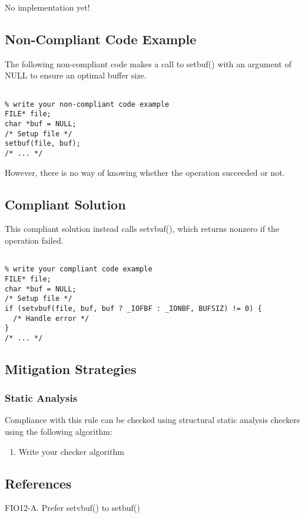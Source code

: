    No implementation yet!

\subsection{Non-Compliant Code Example}

The following non-compliant code makes a call to setbuf() with an argument of
NULL to ensure an optimal buffer size.

\begin{verbatim}

% write your non-compliant code example
FILE* file;
char *buf = NULL;
/* Setup file */
setbuf(file, buf);
/* ... */

\end{verbatim}

However, there is no way of knowing whether the operation succeeded or not.

\subsection{Compliant Solution}

This compliant solution instead calls setvbuf(), which returns nonzero if the
operation failed.

\begin{verbatim}

% write your compliant code example
FILE* file;
char *buf = NULL;
/* Setup file */
if (setvbuf(file, buf, buf ? _IOFBF : _IONBF, BUFSIZ) != 0) {
  /* Handle error */
}
/* ... */

\end{verbatim}

\subsection{Mitigation Strategies}
\subsubsection{Static Analysis} 

Compliance with this rule can be checked using structural static analysis checkers using the following algorithm:

\begin{enumerate}
\item Write your checker algorithm
\end{enumerate}

\subsection{References}


 FIO12-A. Prefer setvbuf() to setbuf()
